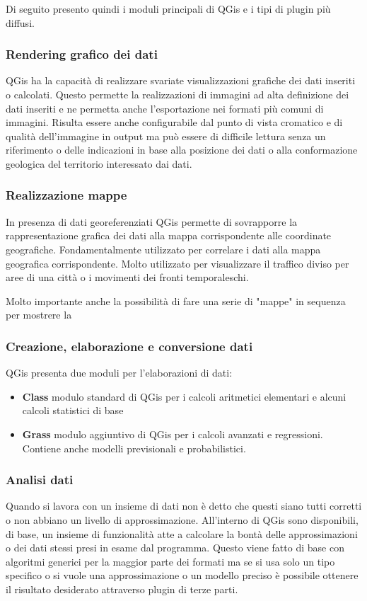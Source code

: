 Di seguito presento quindi i moduli principali di QGis e i tipi di plugin più diffusi.

\subsubsection{Rendering grafico dei dati}
QGis ha la capacità di realizzare svariate visualizzazioni grafiche dei dati inseriti o calcolati. 
Questo permette la realizzazioni di immagini ad alta definizione dei dati inseriti e ne permetta anche l'esportazione nei formati più comuni di immagini. Risulta essere anche configurabile dal punto di vista cromatico e di qualità dell'immagine in output ma può essere di difficile lettura senza un riferimento o delle indicazioni in base alla posizione dei dati o alla conformazione geologica del territorio interessato dai dati.

\subsubsection{Realizzazione mappe}
In presenza di dati georeferenziati QGis permette di sovrapporre la rappresentazione grafica dei dati alla mappa corrispondente alle coordinate geografiche.
Fondamentalmente utilizzato per correlare i dati alla mappa geografica corrispondente. Molto utilizzato per visualizzare il traffico diviso per aree di una città o i movimenti dei fronti temporaleschi. 

Molto importante anche la possibilità di fare una serie di "mappe" in sequenza per mostrere la  

\subsubsection{Creazione, elaborazione e conversione dati}
QGis presenta due moduli per l'elaborazioni di dati:
\begin{itemize}
	\item \textbf{Class} modulo standard di QGis per i calcoli aritmetici elementari e alcuni calcoli statistici di base
	\item \textbf{Grass} modulo aggiuntivo di QGis per i calcoli avanzati e regressioni. Contiene anche modelli previsionali e probabilistici.
\end{itemize}

\subsubsection{Analisi dati}
Quando si lavora con un insieme di dati non è detto che questi siano tutti corretti o non abbiano un livello di approssimazione.
All'interno di QGis sono disponibili, di base, un insieme di funzionalità atte a calcolare la bontà delle approssimazioni o dei dati stessi presi in esame dal programma.
Questo viene fatto di base con algoritmi generici per la maggior parte dei formati ma se si usa solo un tipo specifico o si vuole una approssimazione o un modello preciso è possibile ottenere il risultato desiderato attraverso plugin di terze parti.

